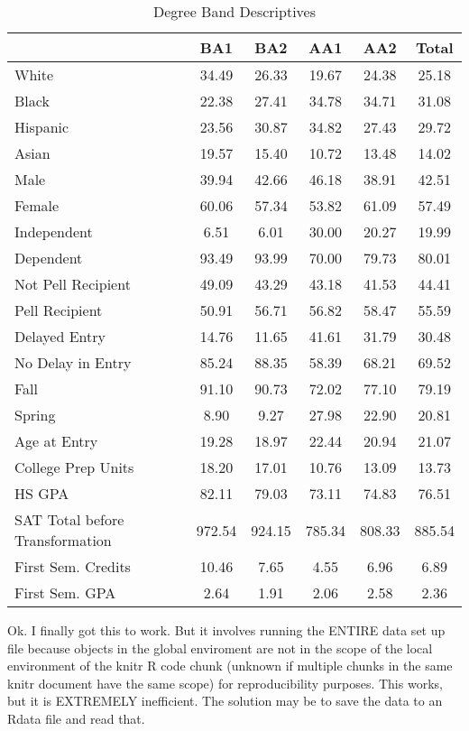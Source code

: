 \documentclass{article}\usepackage[]{graphicx}\usepackage[]{color}
\begin{document}
\begin{table}[ht]
\centering
\caption{Degree Band Descriptives} 
\begin{tabular}{lccccc}
  \toprule
 & BA1 & BA2 & AA1 & AA2 & Total \\ 
  \midrule
White & 34.49 & 26.33 & 19.67 & 24.38 & 25.18 \\ 
  Black & 22.38 & 27.41 & 34.78 & 34.71 & 31.08 \\ 
  Hispanic & 23.56 & 30.87 & 34.82 & 27.43 & 29.72 \\ 
  Asian & 19.57 & 15.40 & 10.72 & 13.48 & 14.02 \\ 
  Male & 39.94 & 42.66 & 46.18 & 38.91 & 42.51 \\ 
  Female & 60.06 & 57.34 & 53.82 & 61.09 & 57.49 \\ 
  Independent & 6.51 & 6.01 & 30.00 & 20.27 & 19.99 \\ 
  Dependent & 93.49 & 93.99 & 70.00 & 79.73 & 80.01 \\ 
  Not Pell Recipient & 49.09 & 43.29 & 43.18 & 41.53 & 44.41 \\ 
  Pell Recipient & 50.91 & 56.71 & 56.82 & 58.47 & 55.59 \\ 
  Delayed Entry & 14.76 & 11.65 & 41.61 & 31.79 & 30.48 \\ 
  No Delay in Entry & 85.24 & 88.35 & 58.39 & 68.21 & 69.52 \\ 
  Fall & 91.10 & 90.73 & 72.02 & 77.10 & 79.19 \\ 
  Spring & 8.90 & 9.27 & 27.98 & 22.90 & 20.81 \\ 
  Age at Entry & 19.28 & 18.97 & 22.44 & 20.94 & 21.07 \\ 
  College Prep Units & 18.20 & 17.01 & 10.76 & 13.09 & 13.73 \\ 
  HS GPA & 82.11 & 79.03 & 73.11 & 74.83 & 76.51 \\ 
  SAT Total before Transformation & 972.54 & 924.15 & 785.34 & 808.33 & 885.54 \\ 
  First Sem. Credits & 10.46 & 7.65 & 4.55 & 6.96 & 6.89 \\ 
  First Sem. GPA & 2.64 & 1.91 & 2.06 & 2.58 & 2.36 \\ 
   \bottomrule
\end{tabular}
\end{table}





Ok. I finally got this to work. But it involves running the ENTIRE data set up 
file because objects in the global enviroment are not in the scope of the local
environment of the knitr R code chunk (unknown if multiple chunks in the same 
knitr document have the same scope) for reproducibility purposes. This works, but 
it is EXTREMELY inefficient. The solution may be to save the data to an Rdata file
and read that. 
\end{document}

